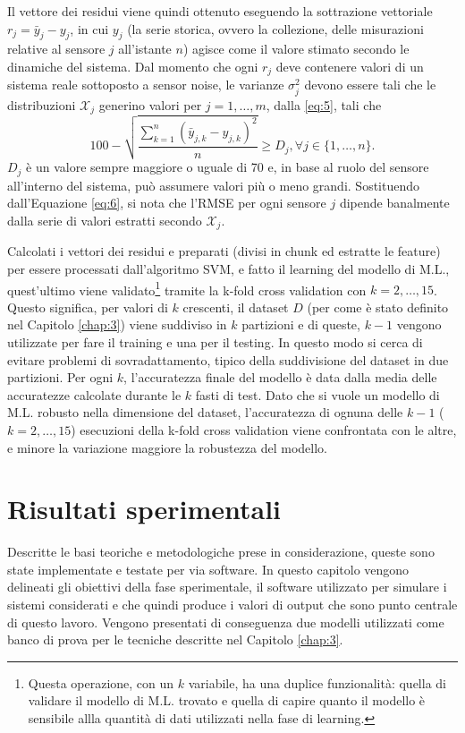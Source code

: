 \documentclass[Lau,binding=0.6cm]{sapthesis}
\begin{document}
Il vettore dei residui viene quindi ottenuto eseguendo la sottrazione vettoriale $r_j = \bar{y}_j - y_j$, in cui $y_j$ (la serie storica, ovvero la collezione, delle misurazioni relative al sensore $j$ all'istante $n$) agisce come il valore stimato secondo le dinamiche del sistema.
Dal momento che ogni $r_j$ deve contenere valori di un sistema reale sottoposto a sensor noise, le varianze $\sigma_j^2$ devono essere tali che le distribuzioni $\mathcal{X}_j$ generino valori per $j=1,\ldots,m$, dalla \ref{eq:5}, tali che
\begin{equation}
    100 - \sqrt{\frac{\sum_{k=1}^n (\bar{y}_{j,k} - y_{j,k})^2}{n}} \geq D_j, \forall j\in\{1,\ldots,n\}\label{eq:7}.
\end{equation}
$D_j$ \`e un valore sempre maggiore o uguale di 70 e, in base al ruolo del sensore all'interno del sistema, pu\`o assumere valori pi\`u o meno grandi.
Sostituendo dall'Equazione \ref{eq:6}, si nota che l'RMSE per ogni sensore $j$ dipende banalmente dalla serie di valori estratti secondo $\mathcal{X}_j$.

Calcolati i vettori dei residui e preparati (divisi in chunk ed estratte le feature) per essere processati dall'algoritmo SVM, e fatto il learning del modello di M.L., 
quest'ultimo viene validato\footnote{Questa operazione, con un $k$ variabile, ha una duplice funzionalit\`a: quella di validare il modello di M.L. trovato e quella di capire quanto il modello \`e sensibile allla quantit\`a di dati utilizzati nella fase di learning.}
tramite la k-fold cross validation con $k=2,\ldots,15$.
Questo significa, per valori di $k$ crescenti, il dataset $D$ (per come \`e stato definito nel Capitolo \ref{chap:3}) viene suddiviso in $k$ partizioni e di queste, $k-1$ vengono utilizzate per fare il training e una per il testing.
In questo modo si cerca di evitare problemi di sovradattamento, tipico della suddivisione del dataset in due partizioni.
Per ogni $k$, l'accuratezza finale del modello \`e data dalla media delle accuratezze calcolate durante le $k$ fasti di test.
Dato che si vuole un modello di M.L. robusto nella dimensione del dataset, l'accuratezza di ognuna delle $k-1$ ($k = 2,\ldots,15$) esecuzioni della k-fold cross validation viene confrontata con le altre, e minore la variazione maggiore la robustezza del modello.


\chapter{Risultati sperimentali}\label{chap:5}
Descritte le basi teoriche e metodologiche prese in considerazione, queste sono state implementate e testate per via software.
In questo capitolo vengono delineati gli obiettivi della fase sperimentale, il software utilizzato per simulare i sistemi considerati e che quindi produce i valori di output 
che sono punto centrale di questo lavoro. Vengono presentati di conseguenza due modelli utilizzati come banco di prova per le tecniche descritte nel Capitolo \ref{chap:3}.
\end{document}
